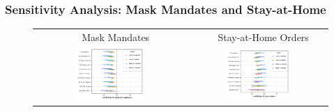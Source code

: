 \documentclass{beamer}
\begin{document}
\begin{frame}
  \frametitle{Sensitivity Analysis: Mask Mandates and Stay-at-Home}
  
  
  \begin{figure}[ht]
  \begin{minipage}{\linewidth}
    \centering
    \begin{tabular}{cc}
 $\quad$ Mask Mandates &$\quad$  Stay-at-Home Orders\\
      \includegraphics[width=0.49\textwidth]{tables_and_figures/pmaskbus-whisker-14}
      &
      \includegraphics[width=0.49\textwidth]{tables_and_figures/pshelter-whisker-14}\qquad
    \end{tabular}
  \end{minipage} %
\end{figure}


\end{frame}
\end{document}
